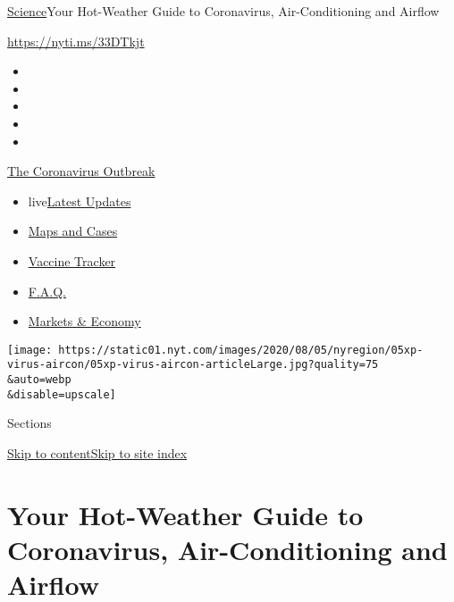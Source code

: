 \href{/section/science}{Science}\textbar{}Your Hot-Weather Guide to
Coronavirus, Air-Conditioning and Airflow

\href{https://nyti.ms/33DTkjt}{https://nyti.ms/33DTkjt}

\begin{itemize}
\item
\item
\item
\item
\item
\end{itemize}

\href{https://www.nytimes.com/news-event/coronavirus?action=click\&pgtype=Article\&state=default\&region=TOP_BANNER\&context=storylines_menu}{The
Coronavirus Outbreak}

\begin{itemize}
\tightlist
\item
  live\href{https://www.nytimes.com/2020/08/08/world/coronavirus-updates.html?action=click\&pgtype=Article\&state=default\&region=TOP_BANNER\&context=storylines_menu}{Latest
  Updates}
\item
  \href{https://www.nytimes.com/interactive/2020/us/coronavirus-us-cases.html?action=click\&pgtype=Article\&state=default\&region=TOP_BANNER\&context=storylines_menu}{Maps
  and Cases}
\item
  \href{https://www.nytimes.com/interactive/2020/science/coronavirus-vaccine-tracker.html?action=click\&pgtype=Article\&state=default\&region=TOP_BANNER\&context=storylines_menu}{Vaccine
  Tracker}
\item
  \href{https://www.nytimes.com/interactive/2020/world/coronavirus-tips-advice.html?action=click\&pgtype=Article\&state=default\&region=TOP_BANNER\&context=storylines_menu}{F.A.Q.}
\item
  \href{https://www.nytimes.com/live/2020/08/07/business/stock-market-today-coronavirus?action=click\&pgtype=Article\&state=default\&region=TOP_BANNER\&context=storylines_menu}{Markets
  \& Economy}
\end{itemize}

\texttt{[image: https://static01.nyt.com/images/2020/08/05/nyregion/05xp-virus-aircon/05xp-virus-aircon-articleLarge.jpg?quality=75\\\&auto=webp\\\&disable=upscale]}

Sections

\protect\hyperlink{site-content}{Skip to
content}\protect\hyperlink{site-index}{Skip to site index}

\hypertarget{your-hot-weather-guide-to-coronavirus-air-conditioning-and-airflow}{%
\section{Your Hot-Weather Guide to Coronavirus, Air-Conditioning and
Airflow}\label{your-hot-weather-guide-to-coronavirus-air-conditioning-and-airflow}}


